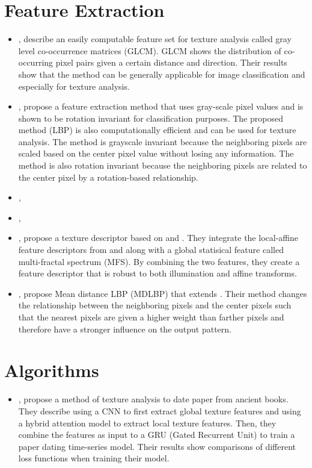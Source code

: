 \documentclass{article}[a4paper]
\newcommand{\bitem}[2]{
    \item[\cite{#1}]
        \citetitle{#1}, \citeyear{#1}
        \newline
        \citeauthor{#1}{ #2}
}
\begin{document}
\section{Feature Extraction}
\begin{itemize}
    \bitem{haralick_textural_1973}{describe an easily computable feature set for
        texture analysis called gray level co-occurrence matrices (GLCM). GLCM
        shows the distribution of co-occurring pixel pairs given a certain
        distance and direction. Their results show that the method can be
        generally applicable for image classification and especially for texture
        analysis.}

    \bitem{ojala_multiresolution_2002}{propose a feature
        extraction method that uses gray-scale pixel values and is shown to be
        rotation invariant for classification purposes. The proposed method (LBP) is
        also computationally efficient and can be used for texture analysis. The
        method is grayscale invariant because the neighboring pixels are scaled
        based on the center pixel value without losing any information. The
        method is also rotation invariant because the neighboring pixels are
        related to the center pixel by a rotation-based relationship.}

    \bitem{lazebnik_local_2006}{}

    \bitem{zhang_local_2007}{}

    \bitem{xu_integrating_2009}{propose a texture descriptor based on
        \cite{lazebnik_local_2006} and \cite{zhang_local_2007}. They integrate
        the local-affine feature descriptors from \cite{lazebnik_local_2006} and
        \cite{zhang_local_2007} along with a global statisical feature called
        multi-fractal spectrum (MFS). By combining the two features, they create
        a feature descriptor that is robust to both illumination and affine
        transforms.}

    \bitem{bedi_mean_2021}{propose Mean distance LBP (MDLBP) that extends
        \cite{ojala_multiresolution_2002}. Their method changes the relationship
        between the neighboring pixels and the center pixels such that the
        nearest pixels are given a higher weight than farther pixels and
        therefore have a stronger influence on the output pattern.}
\end{itemize}

\section{Algorithms}
\begin{itemize}
    \bitem{lu_paper_2021}{propose a method of texture analysis to date paper
        from ancient books. They describe using a CNN to first extract global
        texture features and using a hybrid attention model to extract local
        texture features. Then, they combine the features as input to a GRU
        (Gated Recurrent Unit) to train a paper dating time-series model. Their
        results show comparisons of different loss functions when training their
        model.}
\end{itemize}

\printbibliography
\end{document}
